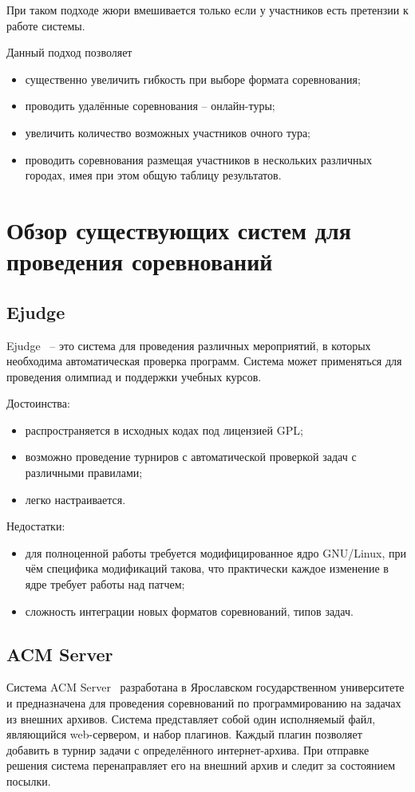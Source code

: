 При таком подходе жюри вмешивается только если у участников есть претензии к работе системы.

Данный подход позволяет
\begin{itemize}
    \item существенно увеличить гибкость при выборе формата соревнования;
    \item проводить удалённые соревнования -- онлайн-туры;
    \item увеличить количество возможных участников очного тура;
    \item проводить соревнования размещая участников в нескольких различных городах,
        имея при этом общую таблицу результатов.
\end{itemize}

\section{Обзор существующих систем для проведения соревнований}
\subsection{Ejudge}
Ejudge~\cite{ejudge} -- это система для проведения различных мероприятий,
в которых необходима автоматическая проверка программ.
Система может применяться для проведения олимпиад и поддержки учебных курсов.

Достоинства:
\begin{itemize}
    \item распространяется в исходных кодах под лицензией GPL;
    \item возможно проведение турниров с автоматической проверкой задач с различными правилами;
    \item легко настраивается.
\end{itemize}

Недостатки:
\begin{itemize}
    \item для полноценной работы требуется модифицированное ядро GNU/Linux,
        при чём специфика модификаций такова, что практически каждое изменение в ядре
        требует работы над патчем;
    \item сложность интеграции новых форматов соревнований, типов задач.
\end{itemize}

\subsection{ACM Server}
Система ACM Server~\cite{acmserver} разработана в Ярославском государственном
университете и предназначена для проведения соревнований по программированию на задачах из внешних архивов.
Система представляет собой один исполняемый файл, являющийся web-сервером, и набор плагинов.
Каждый плагин позволяет добавить в турнир задачи с определённого интернет-архива.
При отправке решения система перенаправляет его на внешний архив и следит за состоянием посылки.

